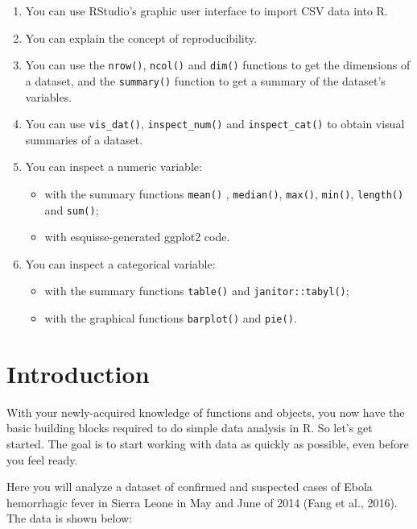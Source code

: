 \documentclass[
  letterpaper,
  DIV=11,
  numbers=noendperiod]{scrreprt}
\begin{document}
\begin{enumerate}
\def\labelenumi{\arabic{enumi}.}
\item
  You can use RStudio's graphic user interface to import CSV data into
  R.
\item
  You can explain the concept of reproducibility.
\item
  You can use the \texttt{nrow()}, \texttt{ncol()} and \texttt{dim()}
  functions to get the dimensions of a dataset, and the
  \texttt{summary()} function to get a summary of the dataset's
  variables.
\item
  You can use \texttt{vis\_dat()}, \texttt{inspect\_num()} and
  \texttt{inspect\_cat()} to obtain visual summaries of a dataset.
\item
  You can inspect a numeric variable:

  \begin{itemize}
  \item
    with the summary functions \texttt{mean()} , \texttt{median()},
    \texttt{max()}, \texttt{min()}, \texttt{length()} and
    \texttt{sum()};
  \item
    with esquisse-generated ggplot2 code.
  \end{itemize}
\item
  You can inspect a categorical variable:

  \begin{itemize}
  \item
    with the summary functions \texttt{table()} and
    \texttt{janitor::tabyl()};
  \item
    with the graphical functions \texttt{barplot()} and \texttt{pie()}.
  \end{itemize}
\end{enumerate}

\section{Introduction}\label{introduction-4}

With your newly-acquired knowledge of functions and objects, you now
have the basic building blocks required to do simple data analysis in R.
So let's get started. The goal is to start working with data as quickly
as possible, even before you feel ready.

Here you will analyze a dataset of confirmed and suspected cases of
Ebola hemorrhagic fever in Sierra Leone in May and June of 2014 (Fang et
al., 2016). The data is shown below:
\end{document}
